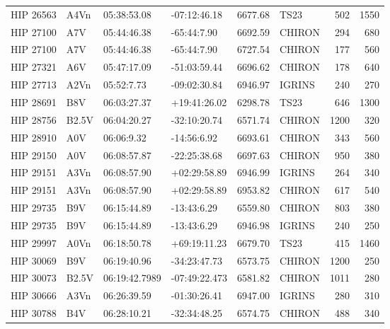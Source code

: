 \documentclass{emulateapj}
\begin{document}
\begin{longtable*}{|l|lllrlrr|}
   HIP 26563 &           A4Vn &    05:38:53.08 &   -07:12:46.18 &  6677.68 &       TS23 &      502 &    1550 \\
   HIP 27100 &            A7V &    05:44:46.38 &    -65:44:7.90 &  6692.59 &     CHIRON &      294 &     680 \\
   HIP 27100 &            A7V &    05:44:46.38 &    -65:44:7.90 &  6727.54 &     CHIRON &      177 &     560 \\
   HIP 27321 &            A6V &    05:47:17.09 &   -51:03:59.44 &  6696.62 &     CHIRON &      178 &     640 \\
   HIP 27713 &           A2Vn &     05:52:7.73 &   -09:02:30.84 &  6946.97 &     IGRINS &      240 &     270 \\
   HIP 28691 &            B8V &    06:03:27.37 &   +19:41:26.02 &  6298.78 &       TS23 &      646 &    1300 \\
   HIP 28756 &          B2.5V &    06:04:20.27 &   -32:10:20.74 &  6571.74 &     CHIRON &     1200 &     320 \\
   HIP 28910 &            A0V &     06:06:9.32 &    -14:56:6.92 &  6693.61 &     CHIRON &      343 &     560 \\
   HIP 29150 &            A0V &    06:08:57.87 &   -22:25:38.68 &  6697.63 &     CHIRON &      950 &     380 \\
   HIP 29151 &           A3Vn &    06:08:57.90 &   +02:29:58.89 &  6946.99 &     IGRINS &      264 &     340 \\
   HIP 29151 &           A3Vn &    06:08:57.90 &   +02:29:58.89 &  6953.82 &     CHIRON &      617 &     540 \\
   HIP 29735 &            B9V &    06:15:44.89 &    -13:43:6.29 &  6559.80 &     CHIRON &      803 &     380 \\
   HIP 29735 &            B9V &    06:15:44.89 &    -13:43:6.29 &  6946.98 &     IGRINS &      240 &     250 \\
   HIP 29997 &           A0Vn &    06:18:50.78 &   +69:19:11.23 &  6679.70 &       TS23 &      415 &    1460 \\
   HIP 30069 &            B9V &    06:19:40.96 &   -34:23:47.73 &  6573.75 &     CHIRON &     1200 &     250 \\
   HIP 30073 &          B2.5V &  06:19:42.7989 &  -07:49:22.473 &  6581.82 &     CHIRON &     1011 &     280 \\
   HIP 30666 &           A3Vn &    06:26:39.59 &   -01:30:26.41 &  6947.00 &     IGRINS &      280 &     310 \\
   HIP 30788 &            B4V &    06:28:10.21 &   -32:34:48.25 &  6574.75 &     CHIRON &      488 &     340 \\

\end{longtable*}
\end{document}
